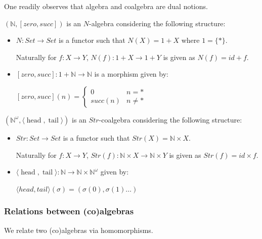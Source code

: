 One readily observes that algebra and coalgebra are dual notions.

\begin{example}
	$(\mathbb{N},[zero,succ])$ is an $N$-algebra considering the following structure:
	
	\begin{itemize}
		\item $N: Set \to Set$ is a functor such that $N(X) = 1+X$ where $1 = \{*\}$.
				
		Naturally for $f: X \to Y$, $N(f): 1+X \to 1 + Y$ is given as $N(f) = id + f$.
		
		\item $[zero,succ]: 1+\mathbb{N} \to \mathbb{N}$ is a morphism given by:
		
		 $[zero,succ](n) = 
		 \begin{cases}
		 0 & n = * \\
		 succ(n) & n \neq *
		 \end{cases}$
	\end{itemize}
\end{example}	

\begin{example}
	$(\mathbb{N}^{\omega}, \langle \operatorname{head}, \operatorname{tail} \rangle)$ is an $Str$-coalgebra considering the following structure:
	
	\begin{itemize}
		\item $Str: Set \to Set$ is a functor such that $Str(X) = \mathbb{N} \times X$.
		
		Naturally for $f: X \to Y$, $Str(f): \mathbb{N} \times X \to \mathbb{N} \times Y$ is given as $Str(f) = id \times f$.
		
		\item $\langle \operatorname{head}, \operatorname{tail} \rangle: \mathbb{N} \to \mathbb{N} \times \mathbb{N}^{\omega}$ given by:
		
		 $\langle head,tail \rangle(\sigma) = (\sigma(0), \sigma(1) \ldots )$
	\end{itemize}
\end{example}

\subsubsection{Relations between (co)algebras}

We relate two (co)algebras via homomorphisms.

